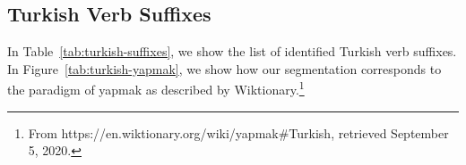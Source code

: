 \documentclass[11pt,letterpaper]{article}
\newcommand{\korean}[1]{\begin{CJK}{UTF8}{mj}#1\end{CJK}}
\begin{document}


\subsection{Turkish Verb Suffixes}

In Table~\ref{tab:turkish-suffixes}, we show the list of identified Turkish verb suffixes.
In Figure~\ref{tab:turkish-yapmak}, we show how our segmentation corresponds to the paradigm of yapmak as described by Wiktionary.\footnote{From https://en.wiktionary.org/wiki/yapmak\#Turkish, retrieved September 5, 2020.}
\end{document}
